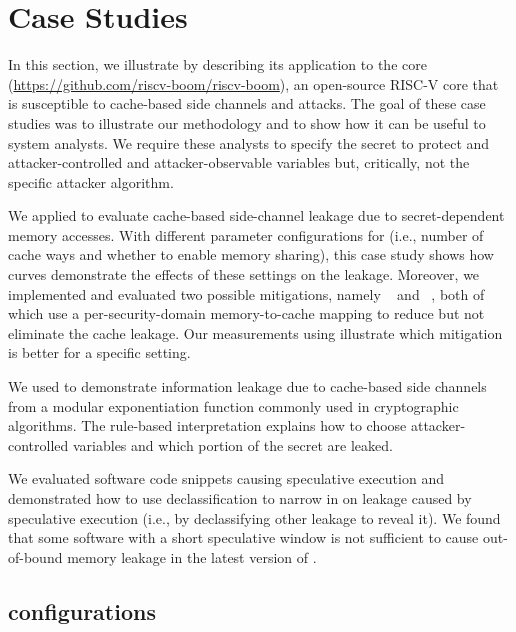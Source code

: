 \section{Case Studies} 
\label{dinome:sec:exp}
In this section, we illustrate \thirdsysname by describing its application
to the \boom core (\url{https://github.com/riscv-boom/riscv-boom}), an
open-source RISC-V core that is susceptible to cache-based side
channels and \spectre attacks.  The goal of these case studies was to
illustrate our methodology and to show how it can be useful to system
analysts.  We require these analysts to specify the secret to protect
and attacker-controlled and attacker-observable variables but,
critically, not the specific attacker algorithm.
\begin{compactitem}
\item We applied \thirdsysname to evaluate cache-based side-channel leakage
  due to secret-dependent memory accesses. With different parameter
  configurations for \boom (i.e., number of cache ways \cacheLineNmbr
  and whether to enable memory sharing), this case study shows how
  \JaccardWithDeclass{\secretsSetSize}{} curves demonstrate the
  effects of these settings on the leakage.  Moreover, we implemented
  and evaluated two possible mitigations, namely
  \scatterCache~\cite{scatterCache} and
  ~\cite{phantomCache}, both of which use a
  per-security-domain memory-to-cache mapping to reduce but not
  eliminate the cache leakage.  Our measurements using
  \JaccardWithDeclass{\secretsSetSize}{} illustrate which mitigation
  is better for a specific \boom setting.
\item We used \thirdsysname to demonstrate information leakage due to
  cache-based side channels from a modular exponentiation function
  commonly used in cryptographic algorithms.  The rule-based
  interpretation explains how to choose attacker-controlled variables
  and which portion of the secret are leaked.
\item We evaluated software code snippets causing speculative
  execution and demonstrated how to use declassification to narrow in
  on leakage caused by speculative execution (i.e., by declassifying
other leakage to reveal it).  We found that some software with a short
speculative window is not sufficient to cause out-of-bound memory
leakage in the latest version of \boom.
\end{compactitem}

 
\subsection{\boom configurations}

